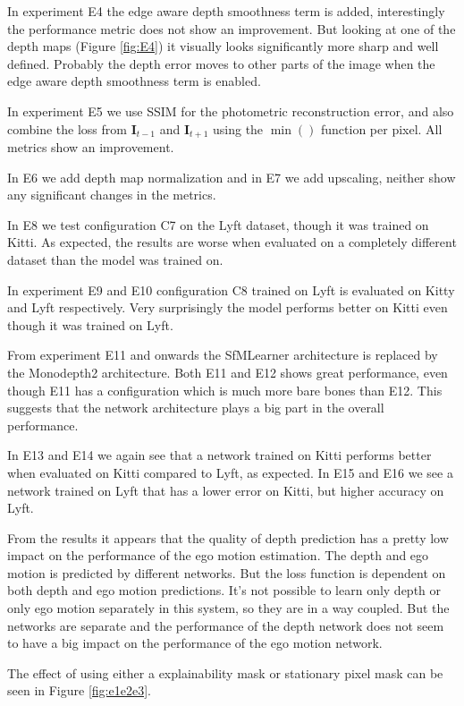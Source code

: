 In experiment E4 the edge aware depth smoothness term is added, interestingly the performance metric does not show an improvement. But looking at one of the depth maps (Figure \ref{fig:E4}) it visually looks significantly more sharp and well defined. Probably the depth error moves to other parts of the image when the edge aware depth smoothness term is enabled.

In experiment E5 we use SSIM for the photometric reconstruction error, and also combine the loss from $\textbf{I}_{t-1}$ and $\textbf{I}_{t+1}$ using the $\min()$ function per pixel. All metrics show an improvement.

In E6 we add depth map normalization and in E7 we add upscaling, neither show any significant changes in the metrics.

In E8 we test configuration C7 on the Lyft dataset, though it was trained on Kitti. As expected, the results are worse when evaluated on a completely different dataset than the model was trained on.

In experiment E9 and E10 configuration C8 trained on Lyft is evaluated on Kitty and Lyft respectively. Very surprisingly the model performs better on Kitti even though it was trained on Lyft.

From experiment E11 and onwards the SfMLearner architecture is replaced by the Monodepth2 architecture. Both E11 and E12 shows great performance, even though E11 has a configuration which is much more bare bones than E12. This suggests that the network architecture plays a big part in the overall performance.

In E13 and E14 we again see that a network trained on Kitti performs better when evaluated on Kitti compared to Lyft, as expected. In E15 and E16 we see a network trained on Lyft that has a lower error on Kitti, but higher accuracy on Lyft.

From the results it appears that the quality of depth prediction has a pretty low impact on the performance of the ego motion estimation. The depth and ego motion is predicted by different networks. But the loss function is dependent on both depth and ego motion predictions. It's not possible to learn only depth or only ego motion separately in this system, so they are in a way coupled. But the networks are separate and the performance of the depth network does not seem to have a big impact on the performance of the ego motion network.

The effect of using either a explainability mask or stationary pixel mask can be seen in Figure \ref{fig:e1e2e3}.


